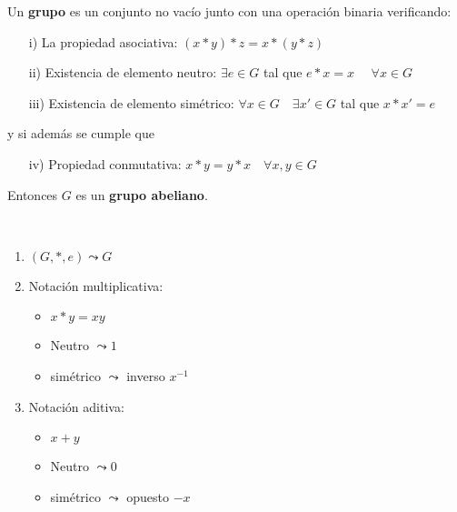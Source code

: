 \begin{definicion}
    Un \textbf{grupo} es un conjunto no vacío junto con una operación binaria verificando:
    \begin{enumerate}
        \item[i)] La propiedad asociativa: $(x\ast y) \ast z = x \ast (y \ast z)$
        \item[ii)] Existencia de elemento neutro: $\exists e \in G$ tal que $e\ast x = x$ \ \ $\forall x \in G$
        \item[iii)] Existencia de elemento simétrico: $\forall x \in G$\ \ $\exists x'\in G$ tal que $x\ast x' = e$
    \end{enumerate}
    y si además se cumple que 
    \begin{enumerate}
        \item[iv)] Propiedad conmutativa: $x\ast y = y \ast x$\ \ $\forall x,y\in G$ 
    \end{enumerate}
    Entonces $G$ es un \textbf{grupo abeliano}.
\end{definicion}

\begin{observacion}\
    \begin{enumerate}
        \item $(G,\ast,e) \leadsto G$
        \item Notación multiplicativa: 
        \begin{itemize}
            \item $x\ast y = xy$
            \item Neutro $\leadsto 1$
            \item simétrico $\leadsto$ inverso $x^{-1}$
        \end{itemize}
        \item Notación aditiva: 
        \begin{itemize}
            \item $x+ y$
            \item Neutro $\leadsto 0$
            \item simétrico $\leadsto$ opuesto $-x$
        \end{itemize}
    \end{enumerate}
\end{observacion}

